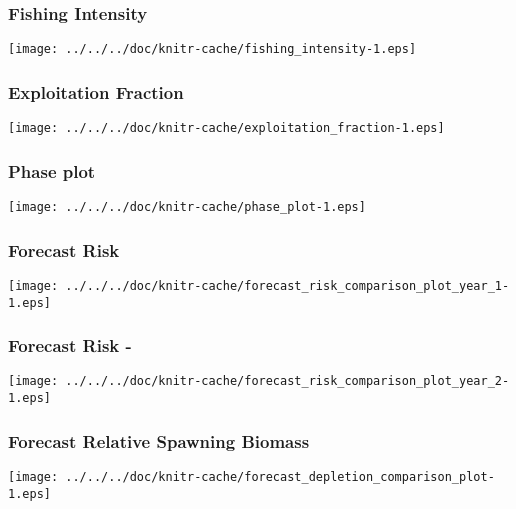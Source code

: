 \documentclass[aspectratio=169]{beamer}
\begin{document}
\begin{frame}
\frametitle{Fishing Intensity}
    \begin{center}
        \hspace{0.5in}
        \texttt{[image: ../../../doc/knitr-cache/fishing\_intensity-1.eps]}
    \end{center}
\end{frame}

\begin{frame}
\frametitle{Exploitation Fraction}
    \begin{center}
        \hspace{0.5in}
        \texttt{[image: ../../../doc/knitr-cache/exploitation\_fraction-1.eps]}
    \end{center}
\end{frame}

\begin{frame}
\frametitle{Phase plot}
    \begin{center}
        \hspace{0.5in}
        \texttt{[image: ../../../doc/knitr-cache/phase\_plot-1.eps]}
    \end{center}
\end{frame}

\begin{frame}
\frametitle{Forecast Risk}
    \begin{center}
        \hspace{0.5in}
        \texttt{[image: ../../../doc/knitr-cache/forecast\_risk\_comparison\_plot\_year\_1-1.eps]}
    \end{center}
\end{frame}


\begin{frame}
\frametitle{Forecast Risk - }
    \begin{center}
        \hspace{0.5in}
        \texttt{[image: ../../../doc/knitr-cache/forecast\_risk\_comparison\_plot\_year\_2-1.eps]}
    \end{center}
\end{frame}


\begin{frame}
\frametitle{Forecast Relative Spawning Biomass }
    \begin{center}
        \hspace{0.5in}
        \texttt{[image: ../../../doc/knitr-cache/forecast\_depletion\_comparison\_plot-1.eps]}
    \end{center}
\end{frame}
\end{document}

